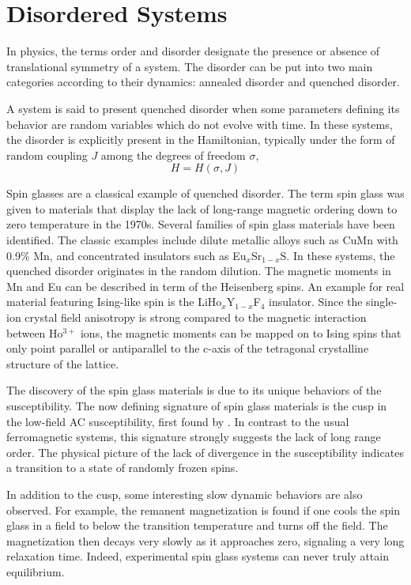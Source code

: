 \section{Disordered Systems}
In physics, the terms order and disorder designate the presence or absence of 
translational symmetry of a system. The disorder can be put into two main categories 
according to their dynamics: annealed disorder and quenched disorder.

A system is said to present quenched disorder when 
some parameters defining its behavior are random variables which do not evolve 
with time. In these systems, the disorder is explicitly present in the Hamiltonian, 
typically under the form of random coupling $J$ among the degrees of freedom $\sigma$,
\begin{equation}
  \label{eq:4}
  H=H(\sigma,J)
\end{equation}

Spin glasses \cite{Binder-Young-1986} are a classical example of quenched disorder. 
The term spin glass was given to materials that display the lack of long-range
magnetic ordering down to zero temperature in the 1970s. 
Several families of spin glass materials have been identified. The classic examples include 
dilute metallic alloys such as CuMn with 0.9\% Mn, and concentrated insulators 
such as Eu$_x$Sr$_{1-x}$S. In these systems, the quenched disorder originates in the random dilution.
The magnetic moments in Mn and Eu can be described in term of the Heisenberg spins.
An example for real material featuring Ising-like spin is the 
LiHo$_x$Y$_{1-x}$F$_4$ insulator\cite{Brooke779,Brooke:2001qf,Ghosh:2003xy,Silevitch:2007sf,PhysRevB.42.4631,PhysRevLett.71.1919}. 
Since the single-ion crystal field anisotropy
is strong compared to the magnetic interaction between Ho$^{3+}$ ions, the magnetic 
moments can be mapped on to Ising spins that only point parallel or antiparallel
to the c-axis of the tetragonal crystalline structure of the lattice. 

The discovery of the spin glass materials is due to its unique behaviors of
the susceptibility. The now defining signature of spin glass materials is 
the cusp in the low-field AC susceptibility, first found by \citet{PhysRevB.6.4220}.
In contrast to the usual ferromagnetic systems, this signature strongly 
suggests the lack of long range order. The physical picture of the lack 
of divergence in the susceptibility indicates a transition to a state of randomly 
frozen spins. 

In addition to the cusp, some interesting slow dynamic 
behaviors are also observed. For example, the remanent magnetization is found 
if one cools the spin glass in a field to below the transition temperature and 
turns off the field. The magnetization then decays very slowly as it approaches 
zero, signaling a very long relaxation time. Indeed, experimental spin glass
systems can never truly attain equilibrium. 

